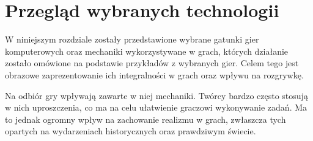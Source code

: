 \chapter{Przegląd wybranych technologii}

W niniejszym rozdziale zostały przedstawione wybrane gatunki gier komputerowych oraz mechaniki wykorzystywane w grach,
których działanie zostało omówione na podstawie przykładów z wybranych gier. Celem tego jest obrazowe zaprezentowanie
ich integralności w grach oraz wpływu na rozgrywkę.

Na odbiór gry wpływają zawarte w niej mechaniki. Twórcy bardzo często stosują w nich uproszczenia, co ma na celu
ułatwienie graczowi wykonywanie zadań. Ma to jednak ogromny wpływ na zachowanie realizmu w grach, zwłaszcza tych opartych
na wydarzeniach historycznych oraz prawdziwym świecie.













